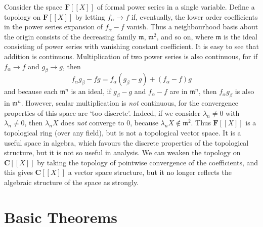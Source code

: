 \begin{example}
    Consider the space $\mathbf{F}[[X]]$ of formal power series in a single variable. Define a topology on $\mathbf{F}[[X]]$ by letting $f_\alpha \to f$ if, eventually, the lower order coefficients in the power series expansion of $f_\alpha - f$ vanish. Thus a neighbourhood basis about the origin consists of the decreasing family $\mathfrak{m}$, $\mathfrak{m}^2$, and so on, where $\mathfrak{m}$ is the ideal consisting of power series with vanishing constant coefficient. It is easy to see that addition is continuous. Multiplication of two power series is also continuous, for if $f_\alpha \to f$ and $g_\beta \to g$, then
    \[ f_\alpha g_\beta - fg = f_\alpha (g_\beta - g) + (f_\alpha - f) g \]
    and because each $\mathfrak{m}^n$ is an ideal, if $g_\beta - g$ and $f_\alpha - f$ are in $\mathfrak{m}^n$, then $f_\alpha g_\beta$ is also in $\mathfrak{m}^n$. However, scalar multiplication is {\it not} continuous, for the convergence properties of this space are `too discrete'. Indeed, if we consider $\lambda_n \neq 0$ with $\lambda_n \neq 0$, then $\lambda_n X$ does {\it not} converge to 0, because $\lambda_n X \not \in \mathfrak{m}^2$. Thus $\mathbf{F}[[X]]$ is a topological ring (over any field), but is not a topological vector space. It is a useful space in algebra, which favours the discrete properties of the topological structure, but it is not so useful in analysis. We can weaken the topology on $\mathbf{C}[[X]]$ by taking the topology of pointwise convergence of the coefficients, and this gives $\mathbf{C}[[X]]$ a vector space structure, but it no longer reflects the algebraic structure of the space as strongly.
\end{example}

\section{Basic Theorems}

